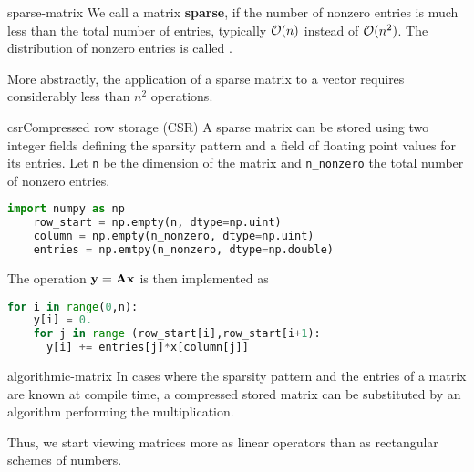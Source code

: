 \begin{Definition}{sparse-matrix}
  We call a matrix \textbf{sparse}, if the number
  of nonzero entries is much less than the total number of entries,
  typically $\mathcal O(n)$ instead of $\mathcal O(n^2)$. The distribution of nonzero entries is called .

  More abstractly, the application of a sparse matrix to a vector
  requires considerably less than $n^2$ operations.
\end{Definition}

\begin{Example*}{csr}{Compressed row storage (CSR)}
  A sparse matrix can be stored using two integer fields defining the
  sparsity pattern and a field of floating point values for its
  entries. Let \lstinline!n! be the dimension of the matrix and
  \lstinline!n_nonzero! the total number of nonzero entries.
  \begin{lstlisting}[language=Python]
    import numpy as np
    row_start = np.empty(n, dtype=np.uint)
    column = np.empty(n_nonzero, dtype=np.uint)
    entries = np.emtpy(n_nonzero, dtype=np.double)
  \end{lstlisting}

  The operation $\mathbf y=\mathbf A\mathbf x$ is then implemented as
  \begin{lstlisting}[language=Python]
    for i in range(0,n):
    y[i] = 0.
    for j in range (row_start[i],row_start[i+1):
      y[i] += entries[j]*x[column[j]]
  \end{lstlisting}  
\end{Example*}

\begin{Remark}{algorithmic-matrix}
  In cases where the sparsity pattern and the entries of a matrix are
  known at compile time, a compressed stored matrix can be substituted
  by an algorithm performing the multiplication.

  Thus, we start viewing matrices more as linear operators than as
  rectangular schemes of numbers.
\end{Remark}
